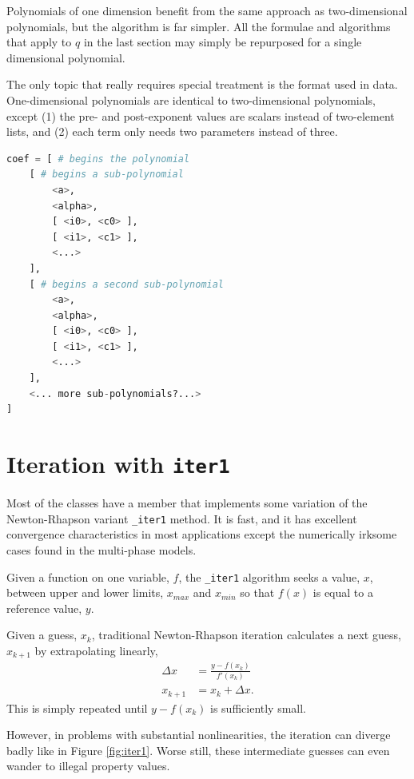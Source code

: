 Polynomials of one dimension benefit from the same approach as two-dimensional polynomials, but the algorithm is far simpler.  All the formulae and algorithms that apply to $q$ in the last section may simply be repurposed for a single dimensional polynomial.  

The only topic that really requires special treatment is the format used in data.  One-dimensional polynomials are identical to two-dimensional polynomials, except (1) the pre- and post-exponent values are scalars instead of two-element lists, and (2) each term only needs two parameters instead of three.

\begin{lstlisting}[language=Python]
coef = [ # begins the polynomial
    [ # begins a sub-polynomial
        <a>, 
        <alpha>,
        [ <i0>, <c0> ],
        [ <i1>, <c1> ],
        <...>
    ],
    [ # begins a second sub-polynomial
        <a>, 
        <alpha>,
        [ <i0>, <c0> ],
        [ <i1>, <c1> ],
        <...>
    ],
    <... more sub-polynomials?...>
]
\end{lstlisting}

\section{Iteration with \texttt{iter1}}\label{sec:num:iter1}

Most of the classes have a member that implements some variation of the Newton-Rhapson variant \verb|_iter1| method.  It is fast, and it has excellent convergence characteristics in most applications except the numerically irksome cases found in the multi-phase models.

Given a function on one variable, $f$, the \verb|_iter1| algorithm seeks a value, $x$, between upper and lower limits, $x_{max}$ and $x_{min}$ so that $f(x)$ is equal to a reference value, $y$.  

Given a guess, $x_k$, traditional Newton-Rhapson iteration calculates a next guess, $x_{k+1}$ by extrapolating linearly,
\begin{align}
\Delta x &= \frac{y-f(x_k)}{f'(x_k)}\\
x_{k+1} &= x_k + \Delta x.
\end{align}
This is simply repeated until $y-f(x_k)$ is sufficiently small.

However, in problems with substantial nonlinearities, the iteration can diverge badly like in Figure \ref{fig:iter1}.  Worse still, these intermediate guesses can even wander to illegal property values.

